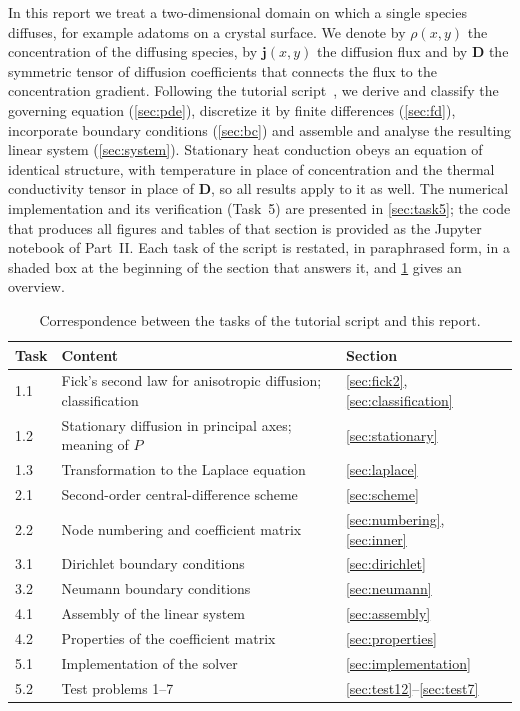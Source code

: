 \documentclass[11pt,a4paper]{article}
\numberwithin{equation}{section}
\theoremstyle{definition}
\theoremstyle{remark}
\newcommand{\bj}{\bm{j}}
\newcommand{\bD}{\mathbf{D}}
\begin{document}
In this report we treat a two-dimensional domain on which a single species diffuses, for
example adatoms on a crystal surface. We denote by $\rho(x,y)$ the concentration of the
diffusing species, by $\bj(x,y)$ the diffusion flux and by $\bD$ the symmetric tensor of
diffusion coefficients that connects the flux to the concentration gradient. Following the
tutorial script~\citep{script}, we derive and classify the governing equation
(\cref{sec:pde}), discretize it by finite differences (\cref{sec:fd}), incorporate
boundary conditions (\cref{sec:bc}) and assemble and analyse the resulting linear system
(\cref{sec:system}). Stationary heat conduction obeys an equation of identical structure,
with temperature in place of concentration and the thermal conductivity tensor in place of
$\bD$, so all results apply to it as well. The numerical implementation and its
verification (Task~5) are presented in \cref{sec:task5}; the code that produces all figures and
tables of that section is provided as the Jupyter notebook of Part~II. Each task of
the script is restated, in paraphrased form, in a shaded box at the beginning of the
section that answers it, and \cref{tab:taskmap} gives an overview.

\begin{table}[ht]
  \centering
  \caption{Correspondence between the tasks of the tutorial script and this report.}
  \label{tab:taskmap}
  \begin{tabularx}{0.85\linewidth}{lXl}
    \toprule
    Task & Content & Section \\
    \midrule
    1.1 & Fick's second law for anisotropic diffusion; classification & \ref{sec:fick2}, \ref{sec:classification} \\
    1.2 & Stationary diffusion in principal axes; meaning of $P$ & \ref{sec:stationary} \\
    1.3 & Transformation to the Laplace equation & \ref{sec:laplace} \\
    2.1 & Second-order central-difference scheme & \ref{sec:scheme} \\
    2.2 & Node numbering and coefficient matrix & \ref{sec:numbering}, \ref{sec:inner} \\
    3.1 & Dirichlet boundary conditions & \ref{sec:dirichlet} \\
    3.2 & Neumann boundary conditions & \ref{sec:neumann} \\
    4.1 & Assembly of the linear system & \ref{sec:assembly} \\
    4.2 & Properties of the coefficient matrix & \ref{sec:properties} \\
    5.1 & Implementation of the solver & \ref{sec:implementation} \\
    5.2 & Test problems 1--7 & \ref{sec:test12}--\ref{sec:test7} \\
    \bottomrule
  \end{tabularx}
\end{table}
\end{document}
